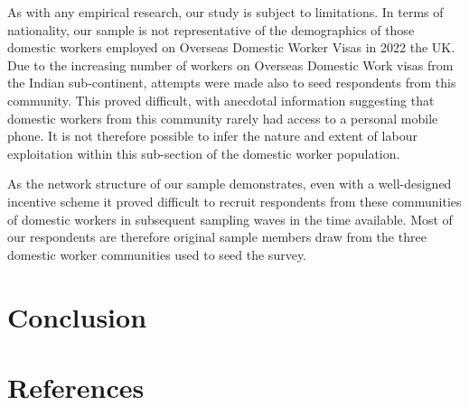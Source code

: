 \documentclass[
  12pt,
]{article}
\theoremstyle{plain}
\theoremstyle{definition}
\begin{document}
As with any empirical research, our study is subject to limitations. In
terms of nationality, our sample is not representative of the
demographics of those domestic workers employed on Overseas Domestic
Worker Visas in 2022 the UK. Due to the increasing number of workers on
Overseas Domestic Work visas from the Indian sub-continent, attempts
were made also to seed respondents from this community. This proved
difficult, with anecdotal information suggesting that domestic workers
from this community rarely had access to a personal mobile phone. It is
not therefore possible to infer the nature and extent of labour
exploitation within this sub-section of the domestic worker population.

As the network structure of our sample demonstrates, even with a
well-designed incentive scheme it proved difficult to recruit
respondents from these communities of domestic workers in subsequent
sampling waves in the time available. Most of our respondents are
therefore original sample members draw from the three domestic worker
communities used to seed the survey.

\section{Conclusion}\label{conclusion}

\newpage

\printbibliography

\newpage

\section{References}\label{references}
\end{document}
